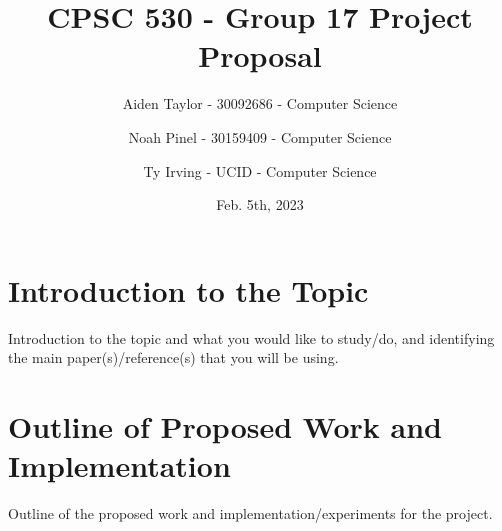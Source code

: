 \documentclass[11pt]{article}
\title{CPSC 530 - Group 17 Project Proposal}
\author{
Aiden Taylor - 30092686 - Computer Science
\and
Noah Pinel - 30159409 - Computer Science
\and
Ty Irving - UCID - Computer Science
}
\date{Feb. 5th, 2023}
\begin{document}
\maketitle
\newpage

\section*{Introduction to the Topic}
Introduction to the topic and what you would like to study/do, and identifying the main paper(s)/reference(s) that you will be using.

\section*{Outline of Proposed Work and Implementation}
Outline of the proposed work and implementation/experiments for the project.
\end{document}
